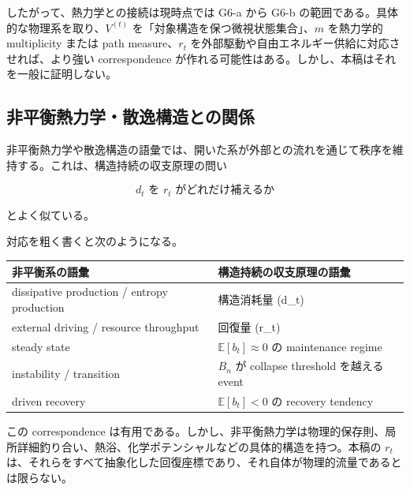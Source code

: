 \documentclass[12pt,a4paper]{article}
\begin{document}
したがって、熱力学との接続は現時点では G6-a から G6-b の範囲である。具体的な物理系を取り、\(V^{(t)}\) を「対象構造を保つ微視状態集合」、\(m\) を熱力学的 multiplicity または path measure、\(r_{t}\) を外部駆動や自由エネルギー供給に対応させれば、より強い correspondence が作れる可能性はある。しかし、本稿はそれを一般に証明しない。

\subsection{非平衡熱力学・散逸構造との関係}\label{ux975eux5e73ux8861ux71b1ux529bux5b66ux6563ux9038ux69cbux9020ux3068ux306eux95a2ux4fc2}

非平衡熱力学や散逸構造の語彙では、開いた系が外部との流れを通じて秩序を維持する。これは、構造持続の収支原理の問い

\[
d_{t} \text{ を } r_{t} \text{ がどれだけ補えるか}
\]

とよく似ている。

対応を粗く書くと次のようになる。

{\def\LTcaptype{table} %
\begin{longtable}[]{@{}
  >{\raggedright\arraybackslash}p{}
  >{\raggedright\arraybackslash}p{}@{}}
\toprule\noalign{}
\begin{minipage}[b]{\linewidth}\raggedright
非平衡系の語彙
\end{minipage} & \begin{minipage}[b]{\linewidth}\raggedright
構造持続の収支原理の語彙
\end{minipage} \\
\midrule\noalign{}
\endhead
\bottomrule\noalign{}
\endlastfoot
dissipative production / entropy production & 構造消耗量 (d\_t) \\
external driving / resource throughput & 回復量 (r\_t) \\
steady state & \(\mathbb E[b_t]\approx 0\) の maintenance regime \\
instability / transition & \(B_n\) が collapse threshold を越える event \\
driven recovery & \(\mathbb E[b_t]<0\) の recovery tendency \\
\end{longtable}
}

この correspondence は有用である。しかし、非平衡熱力学は物理的保存則、局所詳細釣り合い、熱浴、化学ポテンシャルなどの具体的構造を持つ。本稿の \(r_{t}\) は、それらをすべて抽象化した回復座標であり、それ自体が物理的流量であるとは限らない。
\end{document}
